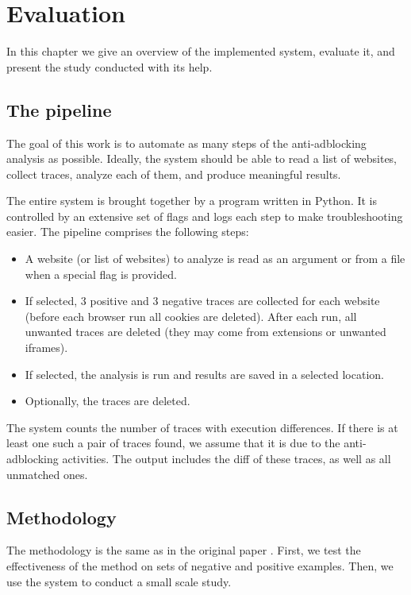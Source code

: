 \chapter{Evaluation}
\label{evaluation}

In this chapter we give an overview of the implemented system, evaluate it, and present the study
conducted with its help.

\section{The pipeline}

The goal of this work is to automate as many steps of the anti-adblocking analysis as possible.
Ideally, the system should be able to read a list of websites, collect traces, analyze
each of them, and produce meaningful results.

The entire system is brought together by a program written in Python.
It is controlled by an extensive set of flags and logs each step to make troubleshooting easier.
The pipeline comprises the following steps:
\begin{itemize}
  \item A website (or list of websites) to analyze is read as an argument or from a file when a special flag is provided.
  \item If selected, 3 positive and 3 negative traces are collected for each website (before each browser run
           all cookies are deleted). After each run, all unwanted traces are deleted (they may come from extensions 
           or unwanted iframes).
  \item If selected, the analysis is run and results are saved in a selected location.
  \item Optionally, the traces are deleted.
\end{itemize}

The system counts the number of traces with execution differences.
If there is at least one such a pair of traces found, we assume that it is due to the anti-adblocking activities.
The output includes the diff of these traces, as well as all unmatched ones.

\section{Methodology}
\label{methodology}

The methodology is the same as in the original paper \cite{DBLP:conf/ndss/ZhuHQSY18}.
First, we test the effectiveness of the method on sets of negative and positive examples.
Then, we use the system to conduct a small scale study.

